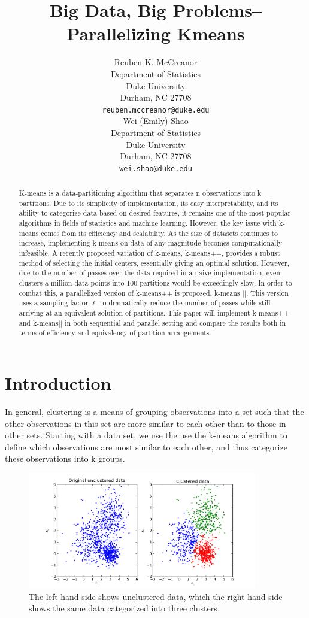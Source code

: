 \documentclass{article} %
\title{Big Data, Big Problems--Parallelizing Kmeans}
\author{
Reuben K. McCreanor \\
Department of Statistics\\
Duke University\\
Durham, NC 27708 \\
\texttt{reuben.mccreanor@duke.edu} \\
\And
Wei (Emily) Shao\\
Department of Statistics\\
Duke University\\
Durham, NC 27708 \\
\texttt{wei.shao@duke.edu} \\
}
\begin{document}
\maketitle

\begin{abstract}
K-means is a data-partitioning algorithm that separates n observations into k partitions. Due to its simplicity of implementation, its easy interpretability, and its ability to categorize data based on desired features, it remains one of the most popular algorithms in fields of statistics and machine learning. However, the key issue with k-means comes from its efficiency and scalability. As the size of datasets continues to increase, implementing k-means on data of any magnitude becomes computationally infeasible. A recently proposed variation of k-means, k-means++, provides a robust method of selecting the initial centers, essentially giving an optimal solution. However, due to the number of passes over the data required in a naive  implementation, even clusters a million data points into 100 partitions would be exceedingly slow. In order to combat this, a parallelized version of k-means++ is proposed, k-means $||$. This version uses a sampling factor $\ell$ to dramatically reduce the number of passes while still arriving at an equivalent solution of partitions. This paper will implement k-means++ and k-means$||$ in both sequential and parallel setting and compare the results both in terms of efficiency and equivalency of partition arrangements.
\end{abstract}

\section{Introduction}
\label{headings}

In general, clustering is a means of grouping observations into a set such that the other observations in this set are more similar to each other than to those in other sets. Starting with a data set, we use the use the k-means algorithm to define which observations are most similar to each other, and thus categorize these observations into k groups. 

\begin{figure}[H]
\includegraphics[width=10cm]{clusterEx}
\centering
\caption{The left hand side shows unclustered data, which the right hand side shows the same data categorized into three clusters}
\end{figure}
\end{document}
